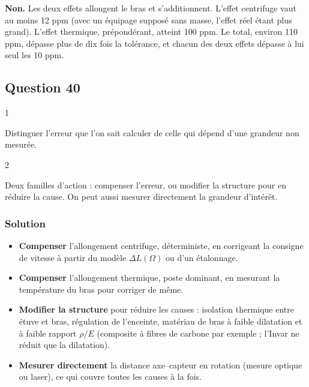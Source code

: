 \documentclass[11pt,a4paper]{article}
\providecommand{\tightlist}{\setlength{\itemsep}{0pt}\setlength{\parskip}{0pt}}
\begin{document}
\textbf{Non.} Les deux effets allongent le bras et s'additionnent. L'effet centrifuge vaut au moins 12 ppm (avec un équipage supposé sans masse, l'effet réel étant plus grand). L'effet thermique, prépondérant, atteint 100 ppm. Le total, environ 110 ppm, dépasse plus de dix fois la tolérance, et chacun des deux effets dépasse à lui seul les 10 ppm.

\hypertarget{question-40}{%
\subsection{Question 40}\label{question-40}}

\begin{indication}{1}

Distinguer l'erreur que l'on sait calculer de celle qui dépend d'une grandeur non mesurée.

\end{indication}

\begin{indication}{2}

Deux familles d'action : compenser l'erreur, ou modifier la structure pour en réduire la cause. On peut aussi mesurer directement la grandeur d'intérêt.

\end{indication}

\hypertarget{solution-39}{%
\subsubsection{Solution}\label{solution-39}}

\begin{itemize}
\tightlist
\item
  \textbf{Compenser} l'allongement centrifuge, déterministe, en corrigeant la consigne de vitesse à partir du modèle \(\Delta L(\Omega)\) ou d'un étalonnage.
\item
  \textbf{Compenser} l'allongement thermique, poste dominant, en mesurant la température du bras pour corriger de même.
\item
  \textbf{Modifier la structure} pour réduire les causes : isolation thermique entre étuve et bras, régulation de l'enceinte, matériau de bras à faible dilatation et à faible rapport \(\rho/E\) (composite à fibres de carbone par exemple ; l'Invar ne réduit que la dilatation).
\item
  \textbf{Mesurer directement} la distance axe--capteur en rotation (mesure optique ou laser), ce qui couvre toutes les causes à la fois.
\end{itemize}
\end{document}
